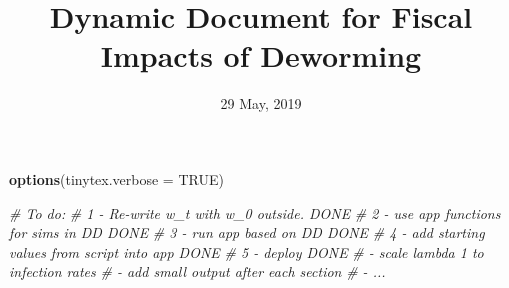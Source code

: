 \documentclass[]{article}
\title{Dynamic Document for Fiscal Impacts of Deworming}
\author{}
\date{29 May, 2019}
\newenvironment{Shaded}{\begin{snugshade}}{\end{snugshade}}
\newcommand{\CommentTok}[1]{\textcolor[rgb]{0.56,0.35,0.01}{\textit{#1}}}
\newcommand{\DataTypeTok}[1]{\textcolor[rgb]{0.13,0.29,0.53}{#1}}
\newcommand{\KeywordTok}[1]{\textcolor[rgb]{0.13,0.29,0.53}{\textbf{#1}}}
\newcommand{\NormalTok}[1]{#1}
\newcommand{\OtherTok}[1]{\textcolor[rgb]{0.56,0.35,0.01}{#1}}
\begin{document}
\maketitle

\def\blue{\color{blue}}

\begin{Shaded}
\begin{Highlighting}[]
\KeywordTok{options}\NormalTok{(}\DataTypeTok{tinytex.verbose =} \OtherTok{TRUE}\NormalTok{)}
\end{Highlighting}
\end{Shaded}

\begin{Shaded}
\begin{Highlighting}[]
\CommentTok{# To do:}
\CommentTok{# 1 - Re-write w_t with w_0 outside.                DONE}
\CommentTok{# 2 - use app functions for sims in DD              DONE }
\CommentTok{# 3 - run app based on DD                           DONE}
\CommentTok{# 4 - add starting values from script into app      DONE}
\CommentTok{# 5 - deploy                                        DONE}
\CommentTok{# - scale lambda 1 to infection rates}
\CommentTok{# - add small output after each section}
\CommentTok{# - ...}


\end{Highlighting}
\end{Shaded}
\end{document}
